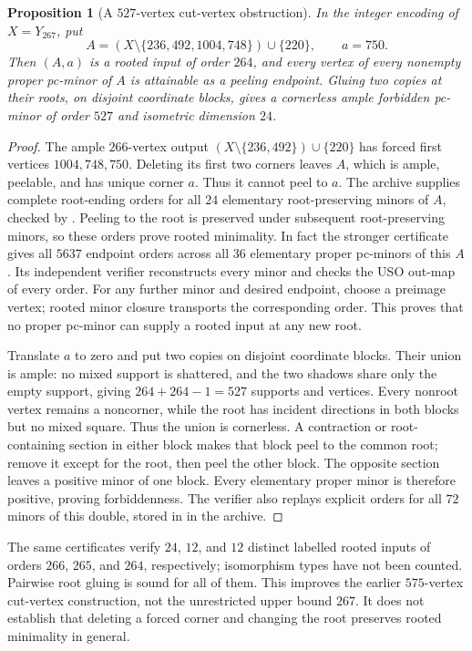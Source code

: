 \documentclass[11pt]{article}
\numberwithin{equation}{section}
\newtheorem{proposition}[theorem]{Proposition}
\theoremstyle{definition}
\theoremstyle{remark}
\begin{document}
\begin{proposition}[A $527$-vertex cut-vertex obstruction]
\label{prop:rooted264-double527}
In the integer encoding of $X=Y_{267}$, put
\[
 A=(X\setminus\{236,492,1004,748\})\cup\{220\},\qquad a=750.
\]
Then $(A,a)$ is a rooted input of order $264$, and every vertex of every
nonempty proper pc-minor of $A$ is attainable as a peeling endpoint.
Gluing two copies at their
roots, on disjoint coordinate blocks, gives a cornerless ample forbidden
pc-minor of order $527$ and isometric dimension $24$.
\end{proposition}
\begin{proof}
The ample $266$-vertex output
$(X\setminus\{236,492\})\cup\{220\}$ has forced first vertices
$1004,748,750$. Deleting its first two corners leaves $A$, which is
ample, peelable, and has unique corner $a$. Thus it cannot peel to $a$.
The archive  supplies complete
root-ending orders for all $24$ elementary root-preserving minors of
$A$, checked by .
Peeling to the root is preserved under subsequent root-preserving minors,
so these orders prove rooted minimality. In fact the stronger certificate
 gives all $5637$ endpoint orders
across all $36$ elementary proper pc-minors of this $A$. Its independent
verifier reconstructs every minor and checks the USO out-map of every order.
For any further minor and desired endpoint, choose a preimage vertex;
rooted minor closure transports the corresponding order. This proves
that no proper pc-minor can supply a rooted input at any new root.

Translate $a$ to zero and put two copies on disjoint coordinate blocks.
Their union is ample: no mixed support is shattered, and the two shadows
share only the empty support, giving $264+264-1=527$ supports and vertices.
Every nonroot vertex remains a noncorner, while the root has incident
directions in both blocks but no mixed square. Thus the union is
cornerless. A contraction or root-containing section in either block
makes that block peel to the common root; remove it except for the root,
then peel the other block. The opposite section leaves a positive minor
of one block. Every elementary proper minor is therefore positive, proving
forbiddenness. The verifier also replays explicit orders for all $72$
minors of this double, stored in  in the archive.
\end{proof}

The same certificates verify $24$, $12$, and $12$ distinct labelled rooted
inputs of orders $266$, $265$, and $264$, respectively; isomorphism types
have not been counted. Pairwise root gluing is sound for all of them.
This improves the earlier $575$-vertex cut-vertex construction, not the
unrestricted upper bound $267$. It does not establish that deleting a
forced corner and changing the root preserves rooted minimality in general.
\end{document}
